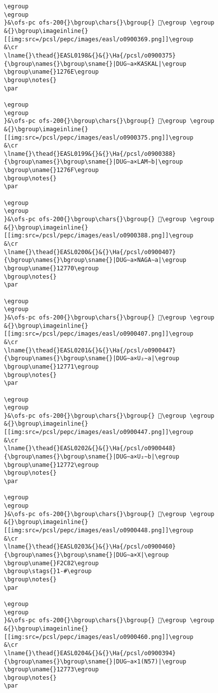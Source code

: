 \begin{verbatim}
\egroup
\egroup
}&\ofs-pc ofs-200{}\bgroup\chars{}\bgroup{} 󲱼\egroup \egroup
&{}\bgroup\imageinline{}[[img:src=/pcsl/pepc/images/easl/o0900369.png]]\egroup
&\cr
\lname{}\thead{}EASL0198&{}&{}\Ha{/pcsl/o0900375}{\bgroup\names{}\bgroup\sname{}|DUG∼a×KASKAL|\egroup
\bgroup\uname{}1276E\egroup
\bgroup\notes{}
\par 

\egroup
\egroup
}&\ofs-pc ofs-200{}\bgroup\chars{}\bgroup{} 𒝮\egroup \egroup
&{}\bgroup\imageinline{}[[img:src=/pcsl/pepc/images/easl/o0900375.png]]\egroup
&\cr
\lname{}\thead{}EASL0199&{}&{}\Ha{/pcsl/o0900388}{\bgroup\names{}\bgroup\sname{}|DUG∼a×LAM∼b|\egroup
\bgroup\uname{}1276F\egroup
\bgroup\notes{}
\par 

\egroup
\egroup
}&\ofs-pc ofs-200{}\bgroup\chars{}\bgroup{} 𒝯\egroup \egroup
&{}\bgroup\imageinline{}[[img:src=/pcsl/pepc/images/easl/o0900388.png]]\egroup
&\cr
\lname{}\thead{}EASL0200&{}&{}\Ha{/pcsl/o0900407}{\bgroup\names{}\bgroup\sname{}|DUG∼a×NAGA∼a|\egroup
\bgroup\uname{}12770\egroup
\bgroup\notes{}
\par 

\egroup
\egroup
}&\ofs-pc ofs-200{}\bgroup\chars{}\bgroup{} 𒝰\egroup \egroup
&{}\bgroup\imageinline{}[[img:src=/pcsl/pepc/images/easl/o0900407.png]]\egroup
&\cr
\lname{}\thead{}EASL0201&{}&{}\Ha{/pcsl/o0900447}{\bgroup\names{}\bgroup\sname{}|DUG∼a×U₂∼a|\egroup
\bgroup\uname{}12771\egroup
\bgroup\notes{}
\par 

\egroup
\egroup
}&\ofs-pc ofs-200{}\bgroup\chars{}\bgroup{} 𒝱\egroup \egroup
&{}\bgroup\imageinline{}[[img:src=/pcsl/pepc/images/easl/o0900447.png]]\egroup
&\cr
\lname{}\thead{}EASL0202&{}&{}\Ha{/pcsl/o0900448}{\bgroup\names{}\bgroup\sname{}|DUG∼a×U₂∼b|\egroup
\bgroup\uname{}12772\egroup
\bgroup\notes{}
\par 

\egroup
\egroup
}&\ofs-pc ofs-200{}\bgroup\chars{}\bgroup{} 𒝲\egroup \egroup
&{}\bgroup\imageinline{}[[img:src=/pcsl/pepc/images/easl/o0900448.png]]\egroup
&\cr
\lname{}\thead{}EASL0203&{}&{}\Ha{/pcsl/o0900460}{\bgroup\names{}\bgroup\sname{}|DUG∼a×X|\egroup
\bgroup\uname{}F2C82\egroup
\bgroup\stags{}1-#\egroup
\bgroup\notes{}
\par 

\egroup
\egroup
}&\ofs-pc ofs-200{}\bgroup\chars{}\bgroup{} 󲲂\egroup \egroup
&{}\bgroup\imageinline{}[[img:src=/pcsl/pepc/images/easl/o0900460.png]]\egroup
&\cr
\lname{}\thead{}EASL0204&{}&{}\Ha{/pcsl/o0900394}{\bgroup\names{}\bgroup\sname{}|DUG∼a×1(N57)|\egroup
\bgroup\uname{}12773\egroup
\bgroup\notes{}
\par 


\end{verbatim}
